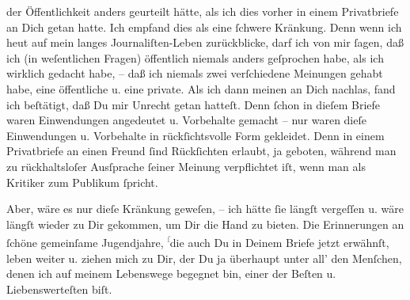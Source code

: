                der Öffentlichkeit anders
               geurteilt hätte, als ich dies vorher in einem Privatbriefe an Dich getan hatte. Ich
               empfand dies als eine{ }ſchwere Kränkung. Denn wenn ich heut auf mein langes
               Journaliſten-Leben zurückblicke, darf ich von mir{ }ſagen, daß ich (in weſentlichen
               Fragen) öffentlich niemals anders geſprochen habe, als ich wirklich gedacht habe, –
               daß ich niemals zwei verſchiedene Meinungen gehabt habe, eine öffentliche {\pb}u. eine private. Als ich dann meinen \label{K_L03478-5v}\label{K_L03478-5} an Dich
               nachlas, fand ich beſtätigt, daß Du mir Unrecht getan hatteſt. Denn{ }ſchon in dieſem
               Briefe waren Einwendungen angedeutet u. Vorbehalte gemacht – nur waren dieſe
               Einwendungen u. Vorbehalte in rückſichtsvolle Form gekleidet. Denn in einem
               Privatbriefe an einen Freund{ }ſind Rückſichten erlaubt, ja geboten, während man zu
               rückhaltsloſer Ausſprache{ }ſeiner Meinung verpflichtet iſt, wenn man als Kritiker zum
               Publikum{ }ſpricht.\pend
           
\pstart
           Aber, wäre es nur {\pb}dieſe Kränkung geweſen, – ich
               hätte{ }ſie längſt vergeſſen u. wäre längſt wieder zu Dir gekommen, um Dir die Hand zu
               bieten. Die Erinnerungen an{ }ſchöne gemeinſame Jugendjahre, \substVorne{}\textsuperscript{\textcolor{gray}{ſ}}\substDazwischen{}d\substHinten{}ie auch Du in Deinem Briefe jetzt erwähnſt, leben weiter u. ziehen mich zu
               Dir, der Du ja überhaupt unter all’ den Menſchen, denen ich auf meinem Lebenswege
               begegnet bin, einer der Beſten u. Liebenswerteſten biſt.\pend
           
